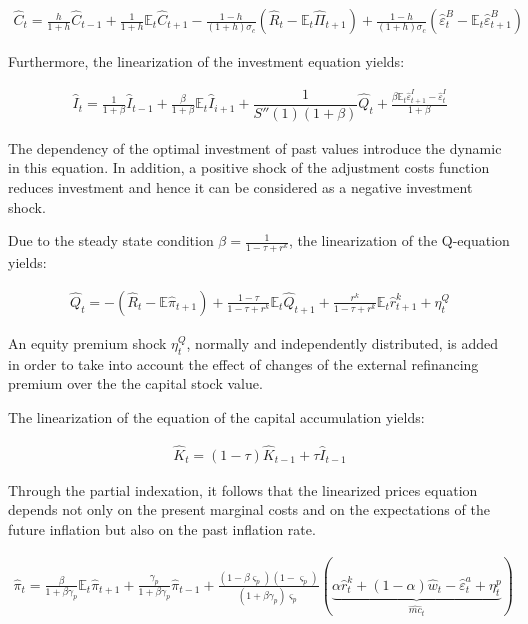 \documentclass{pracamgr}
\numberwithin{equation}{section}
\begin{document}
\begin{align}
\hat{C}_{t} = \frac{h}{1+h}\hat{C}_{t-1}+ \frac{1}{1+h}\mathbb{E}_{t}\hat{C}_{t+1} - \frac{1-h}{(1+h)\sigma_{c}} \left( \hat{R}_{t} - \mathbb{E}_{t} \hat{\Pi}_{t+1} \right) + \frac{1-h}{(1+h)\sigma_{c}} \left( \hat{\varepsilon}_{t}^{B} - \mathbb{E}_{t}\hat{\varepsilon}_{t+1}^{B} \right)
\end{align}

Furthermore, the linearization of the investment equation yields:

\begin{align}
\hat{I}_{t} = \frac{1}{1+\beta} \hat{I}_{t-1} + \frac{\beta}{1+\beta} \mathbb{E}_{t} \hat{I}_{i+1} + \dfrac{1}{S''(1)(1+\beta)}\hat{Q}_{t} + \frac{\beta \mathbb{E}_{t} \hat{\varepsilon}_{t+1}^{I} - \hat{\varepsilon}_{t}^{I}}{1+\beta}
\end{align}

The dependency of the optimal investment of past values introduce the dynamic in this equation. In addition, a positive shock of the adjustment costs function reduces investment and hence it can be considered as a negative investment shock.

Due to the steady state condition $\beta = \frac{1}{1-\tau +r^{k}}$, the linearization of the Q-equation yields:

\begin{align}
\hat{Q}_{t} = - \left( \hat{R}_{t} - \mathbb{E}\hat{\pi}_{t+1} \right) + \frac{1-\tau}{1-\tau +r^{k}} \mathbb{E}_{t} \hat{Q}_{t+1} + \frac{r^{k}}{1-\tau +r^{k}} \mathbb{E}_{t}\hat{r}^{k}_{t+1} + \eta_{t}^{Q}
\end{align}

An equity premium shock $\eta_{t}^{Q}$, normally and independently distributed, is added in order to take into account the effect of changes of the external refinancing premium over the the capital stock value.

The linearization of the equation of the capital accumulation yields:

\begin{align}
\hat{K}_{t} = (1-\tau)\hat{K}_{t-1} + \tau\hat{I}_{t-1}
\end{align}

Through the partial indexation, it follows that the linearized prices equation depends not only on the present marginal costs and on the expectations of the future inflation but also on the past inflation rate.

\begin{align}
\hat{\pi}_{t} = \frac{\beta}{1+\beta \gamma_{p}} \mathbb{E}_{t} \hat{\pi}_{t+1} + \frac{\gamma_{p}}{1+\beta \gamma_{p}} \hat{\pi}_{t-1} + \frac{\left( 1 - \beta \varsigma_{p} \right) \left( 1 - \varsigma_{p} \right)}{\left(1+\beta \gamma_{p} \right) \varsigma_{p}} \left( \underbrace{ \alpha \hat{r}^{k}_{t} + (1-\alpha)\hat{w}_{t} - \hat{\varepsilon}_{t}^{a} + \eta_{t}^{p} }_{\hat{mc}_{t}} \right)
\end{align}
\end{document}
